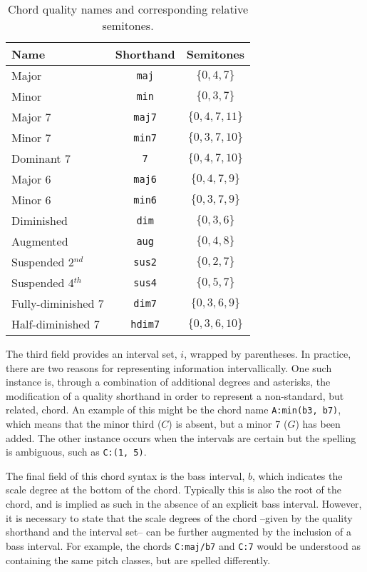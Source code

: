 \begin{table}[h]
\begin{center}
\caption{Chord quality names and corresponding relative semitones.}
\label{tab:qualities}
\begin{tabular}{l | c | c}
Name & Shorthand & Semitones \\
\hline
Major & \texttt{maj} & $\{0, 4, 7\}$ \\
Minor & \texttt{min} & $\{0, 3, 7\}$ \\
Major 7 & \texttt{maj7} & $\{0, 4, 7, 11\}$ \\
Minor 7 & \texttt{min7} & $\{0, 3, 7, 10\}$ \\
Dominant 7 & \texttt{7} & $\{0, 4, 7, 10\}$ \\
Major 6 & \texttt{maj6} & $\{0, 4, 7, 9\}$ \\
Minor 6 & \texttt{min6} & $\{0, 3, 7, 9\}$ \\
Diminished & \texttt{dim} & $\{0, 3, 6\}$ \\
Augmented & \texttt{aug} & $\{0, 4, 8\}$ \\
Suspended 2$^{nd}$ & \texttt{sus2} & $\{0, 2, 7\}$ \\
Suspended 4$^{th}$ & \texttt{sus4} & $\{0, 5, 7\}$ \\
Fully-diminished 7 & \texttt{dim7} & $\{0, 3, 6, 9\}$ \\
Half-diminished 7 & \texttt{hdim7} & $\{0, 3, 6, 10\}$ \\
\hline
\end{tabular}
\end{center}
\end{table}


The third field provides an interval set, $i$, wrapped by parentheses.
In practice, there are two reasons for representing information intervallically.
One such instance is, through a combination of additional degrees and asterisks, the modification of a quality shorthand in order to represent a non-standard, but related, chord.
An example of this might be the chord name \texttt{A:min(\*b3, b7)}, which means that the minor third ($C$) is absent, but a minor 7 ($G$) has been added.
The other instance occurs when the intervals are certain but the spelling is ambiguous, such as \texttt{C:(1, 5)}. %

The final field of this chord syntax is the bass interval, $b$, which indicates the scale degree at the bottom of the chord.
Typically this is also the root of the chord, and is implied as such in the absence of an explicit bass interval.
However, it is necessary to state that the scale degrees of the chord --given by the quality shorthand and the interval set-- can be further augmented by the inclusion of a bass interval.
For example, the chords \texttt{C:maj/b7} and \texttt{C:7} would be understood as containing the same pitch classes, but are spelled differently.


